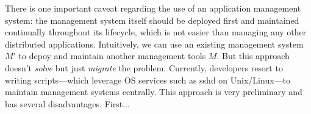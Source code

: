 There is one important caveat regarding the use of an
application management system: the management system itself
should be deployed first and maintained continually
throughout its lifecycle, which is not easier than managing
any other distributed applications. Intuitively, we can use
an existing management system $M'$ to depoy and maintain
another management tools $M$. But this approach doesn't
\emph{solve} but just \emph{migrate} the problem.
Currently, developers resort to writing scripts---which
leverage OS services such as sshd on Unix/Linux---to
maintain management systems centrally. This approach is very
preliminary and has several disadvantages. First...

% 
% 
% 
% 
% 
% 
% 
% 
% 
% 
% 

